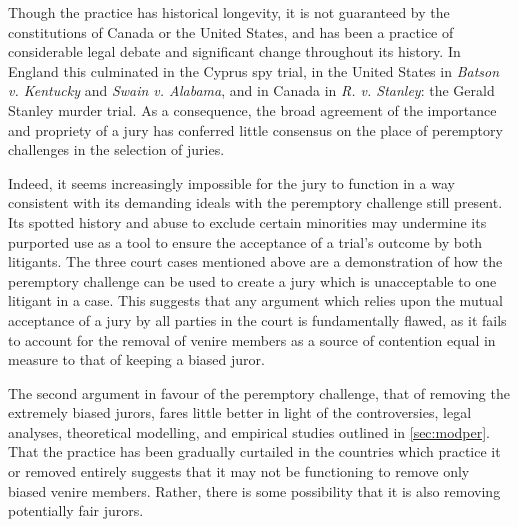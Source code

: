 Though the practice has historical longevity, it is not guaranteed by the constitutions of Canada or the United States, and has
been a practice of considerable legal debate and significant change throughout its history. In England this culminated in the
Cyprus spy trial, in the United States in \textit{Batson v. Kentucky} and \textit{Swain v. Alabama}, and in Canada in
\textit{R. v. Stanley}: the Gerald Stanley  murder trial. As a consequence, the broad agreement of the importance and propriety of
a jury has conferred little consensus on the place of peremptory challenges in the selection of juries.

Indeed, it seems increasingly impossible for the jury to function in a way consistent with its demanding ideals with the
peremptory challenge still present. Its spotted history and abuse to exclude certain minorities may undermine its purported use as a
tool to ensure the acceptance of a trial's outcome by both litigants. The three court cases mentioned above are a demonstration of 
how the peremptory challenge can be used to create a jury which is unacceptable to one litigant in a case. This suggests that
any argument which relies upon the mutual acceptance of a jury by all parties in the court is fundamentally flawed, as it fails to
account for the removal of venire members as a source of contention equal in measure to that of keeping a biased juror.

The second argument in favour of the peremptory challenge, that of removing the extremely biased jurors, fares little better in
light of the controversies, legal analyses, theoretical modelling, and empirical studies outlined in \ref{sec:modper}. That the
practice has been gradually curtailed in the countries which practice it or removed entirely suggests that it may not be
functioning to remove only biased venire members. Rather, there is some possibility that it is also removing potentially fair
jurors.